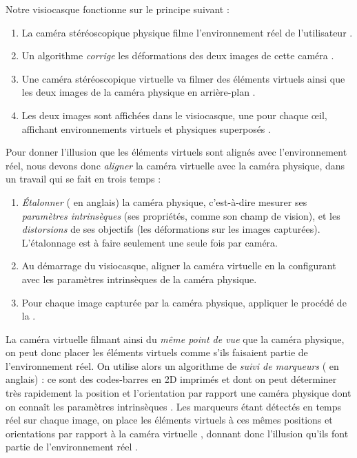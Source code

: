 Notre visiocasque fonctionne sur le principe suivant :
\begin{enumerate}
  \item La caméra stéréoscopique physique filme l'environnement réel de l'utilisateur .
  \item Un algorithme \emph{corrige} les déformations des deux images de cette caméra .
  \item Une caméra stéréoscopique virtuelle va filmer des éléments virtuels ainsi que les deux images de la caméra physique en arrière-plan .
  \item Les deux images sont affichées dans le visiocasque, une pour chaque \oe il, affichant environnements virtuels et physiques superposés .
\end{enumerate}
\medskip
Pour donner l'illusion que les éléments virtuels sont alignés avec l'environnement réel, nous devons donc \emph{aligner} la caméra virtuelle avec la caméra physique, dans un travail qui se fait en trois temps :
\begin{enumerate}
  \item \emph{Étalonner} ( en anglais) la caméra physique, c'est-à-dire mesurer ses \emph{paramètres intrinsèques} (ses propriétés, comme son champ de vision), et les \emph{distorsions} de ses objectifs (les déformations sur les images capturées). L'étalonnage est à faire seulement une seule fois par caméra.
  \item Au démarrage du visiocasque, aligner la caméra virtuelle en la configurant avec les paramètres intrinsèques de la caméra physique.
  \item Pour chaque image capturée par la caméra physique, appliquer le procédé de la .
\end{enumerate}
\medskip

La caméra virtuelle filmant ainsi du \emph{même point de vue} que la caméra physique, on peut donc placer les éléments virtuels comme s'ils faisaient partie de l'environnement réel. On utilise alors un algorithme de \emph{suivi de marqueurs} ( en anglais) : ce sont des codes-barres en 2D imprimés  et dont on peut déterminer très rapidement la position et l'orientation par rapport une caméra physique dont on connaît les paramètres intrinsèques \cite{Garrido-Jurado2014}. Les marqueurs étant détectés en temps réel sur chaque image, on place les éléments virtuels à ces mêmes positions et orientations par rapport à la caméra virtuelle , donnant donc l'illusion qu'ils font partie de l'environnement réel .

